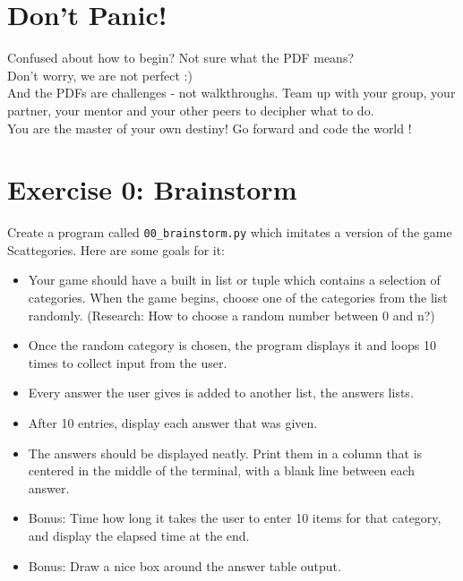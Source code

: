 \documentclass{42-en}
\begin{document}
\chapter{Don't Panic!}

Confused about how to begin? Not sure what the PDF means?\\

Don't worry, we are not perfect :)\\

And the PDFs are challenges - not walkthroughs. Team up with your group, your partner,
your mentor and your other peers to decipher what to do.\\

You are the master of your own destiny! Go forward and code the world !

\startexercices



\chapter{Exercise 0: Brainstorm}
\makeheaderfiles

Create a program called \texttt{00\_brainstorm.py} which imitates a version of the game Scattegories. Here are some goals for it:

\begin{itemize}
	\item Your game should have a built in list or tuple which contains a selection of categories. When the game begins, choose one of the categories from the list randomly. (Research: How to choose a random number between 0 and n?)
	\item Once the random category is chosen, the program displays it and loops 10 times to collect input from the user.
	\item Every answer the user gives is added to another list, the answers lists.
	\item After 10 entries, display each answer that was given.
	\item The answers should be displayed neatly. Print them in a column that is centered in the middle of the terminal, with a blank line between each answer.
	\item Bonus: Time how long it takes the user to enter 10 items for that category, and display the elapsed time at the end.
	\item Bonus: Draw a nice box around the answer table output.
\end{itemize}
\end{document}
